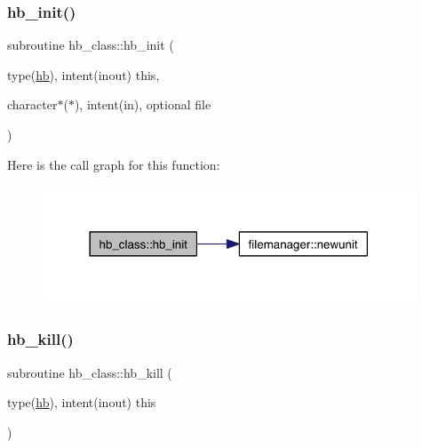 \mbox{\label{namespacehb__class_aad89f206670f2c2396f92abf66cf9c1d}} 
\subsubsection{\texorpdfstring{hb\+\_\+init()}{hb\_init()}}
{\footnotesize\ttfamily subroutine hb\+\_\+class\+::hb\+\_\+init (\begin{DoxyParamCaption}\item[{type(\hyperlink{structhb__class_1_1hb}{hb}), intent(inout)}]{this,  }\item[{character$\ast$($\ast$), intent(in), optional}]{file }\end{DoxyParamCaption})\hspace{0.3cm}{\ttfamily [private]}}

Here is the call graph for this function\+:\nopagebreak
\begin{figure}[H]
\begin{center}
\leavevmode
\includegraphics[width=314pt]{namespacehb__class_aad89f206670f2c2396f92abf66cf9c1d_cgraph}
\end{center}
\end{figure}
\mbox{\label{namespacehb__class_a696c9e145feab6ab780338ffcf6d6d4b}} 
\subsubsection{\texorpdfstring{hb\+\_\+kill()}{hb\_kill()}}
{\footnotesize\ttfamily subroutine hb\+\_\+class\+::hb\+\_\+kill (\begin{DoxyParamCaption}\item[{type(\hyperlink{structhb__class_1_1hb}{hb}), intent(inout)}]{this }\end{DoxyParamCaption})\hspace{0.3cm}{\ttfamily [private]}}

